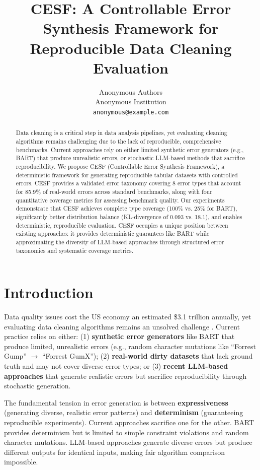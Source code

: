 \documentclass[11pt,a4paper]{article}
\title{CESF: A Controllable Error Synthesis Framework for Reproducible Data Cleaning Evaluation}
\author{%
Anonymous Authors\\
Anonymous Institution\\
\texttt{anonymous@example.com}
}
\date{}
\begin{document}
\maketitle

\begin{abstract}
Data cleaning is a critical step in data analysis pipelines, yet evaluating cleaning algorithms remains challenging due to the lack of reproducible, comprehensive benchmarks. Current approaches rely on either limited synthetic error generators (e.g., BART) that produce unrealistic errors, or stochastic LLM-based methods that sacrifice reproducibility. We propose CESF (Controllable Error Synthesis Framework), a deterministic framework for generating reproducible tabular datasets with controlled errors. CESF provides a validated error taxonomy covering 8 error types that account for 85.9\% of real-world errors across standard benchmarks, along with four quantitative coverage metrics for assessing benchmark quality. Our experiments demonstrate that CESF achieves complete type coverage (100\% vs. 25\% for BART), significantly better distribution balance (KL-divergence of 0.093 vs. 18.1), and enables deterministic, reproducible evaluation. CESF occupies a unique position between existing approaches: it provides deterministic guarantees like BART while approximating the diversity of LLM-based approaches through structured error taxonomies and systematic coverage metrics.
\end{abstract}

\section{Introduction}
\label{sec:intro}

Data quality issues cost the US economy an estimated \$3.1 trillion annually, yet evaluating data cleaning algorithms remains an unsolved challenge \citep{fan2012foundations}. Current practice relies on either: (1) \textbf{synthetic error generators} like BART \citep{arocena2015error} that produce limited, unrealistic errors (e.g., random character mutations like ``Forrest Gump'' $\rightarrow$ ``Forrest GumX''); (2) \textbf{real-world dirty datasets} that lack ground truth and may not cover diverse error types; or (3) \textbf{recent LLM-based approaches} \citep{tableeg2025authentic} that generate realistic errors but sacrifice reproducibility through stochastic generation.

The fundamental tension in error generation is between \textbf{expressiveness} (generating diverse, realistic error patterns) and \textbf{determinism} (guaranteeing reproducible experiments). Current approaches sacrifice one for the other. BART provides determinism but is limited to simple constraint violations and random character mutations. LLM-based approaches generate diverse errors but produce different outputs for identical inputs, making fair algorithm comparison impossible.
\end{document}
